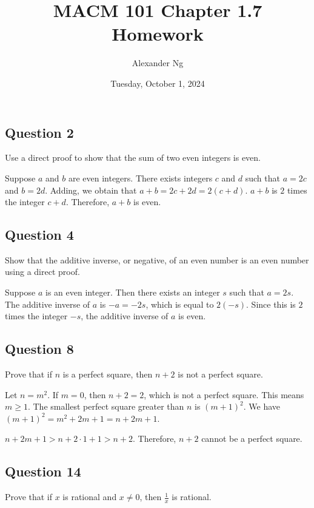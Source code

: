\documentclass[12pt]{article}
\begin{document}
\title{MACM 101 Chapter 1.7 Homework}
\author{Alexander Ng}
\date{Tuesday, October 1, 2024}

\maketitle

\subsection*{Question 2}

Use a direct proof to show that the sum of two even integers is even.

Suppose $a$ and $b$ are even integers. There exists integers $c$ and $d$ such that
$a = 2c$ and $b = 2d$. Adding, we obtain that $a + b = 2c + 2d = 2(c + d)$.
$a + b$ is $2$ times the integer $c + d$. Therefore, $a + b$ is even.

\subsection*{Question 4}

Show that the additive inverse, or negative, of an even number is an even number
using a direct proof.

Suppose $a$ is an even integer. Then there exists an integer $s$ such that 
$a = 2s$. The additive inverse of $a$ is $-a = -2s$, which is equal to $2(-s)$.
Since this is $2$ times the integer $-s$, the additive inverse of $a$ is even.

\subsection*{Question 8}

Prove that if $n$ is a perfect square, then $n + 2$ is not a perfect square.

Let $n = m^2$. If $m = 0$, then $n+2=2$, which is not a perfect square. This
means $m \geq 1$. The smallest perfect square greater than $n$ is $(m+1)^2$.
We have $(m+1)^2 = m^2 + 2m + 1 = n + 2m + 1$.

$n + 2m + 1 > n + 2 \cdot 1 + 1 > n+2$. Therefore, $n+2$ cannot be a perfect 
square.

\subsection*{Question 14}

Prove that if $x$ is rational and $x \ne 0$, then $\frac{1}{x}$ is rational.
\end{document}
